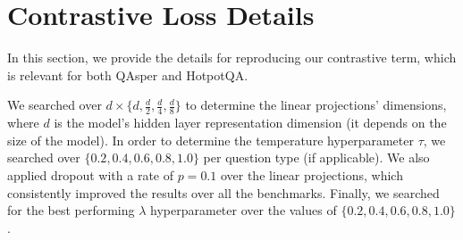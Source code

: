\section{Contrastive Loss Details}
\label{sec:contrastive}
In this section, we provide the details for reproducing our contrastive term, which is relevant for both QAsper and HotpotQA.

We searched over $d\times\{d,\frac{d}{2},\frac{d}{4},\frac{d}{8}\}$ to determine the linear projections' dimensions, where $d$ is the model's hidden layer representation dimension (it depends on the size of the model). In order to determine the temperature hyperparameter $\tau$, we searched over $\{0.2,0.4,0.6,0.8,1.0\}$ per question type (if applicable). We also applied dropout with a rate of ${p=0.1}$ over the linear projections, which consistently improved the results over all the benchmarks. Finally, we searched for the best performing $\lambda$ hyperparameter over the values of $\{0.2,0.4,0.6,0.8,1.0\}$.

